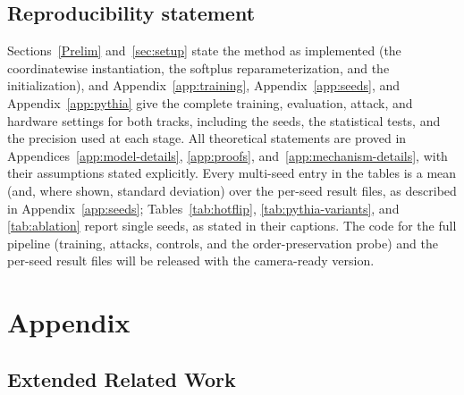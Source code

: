 \documentclass{article}
\theoremstyle{plain}
\theoremstyle{definition}
\theoremstyle{remark}
\theoremstyle{plain}
\begin{document}
\subsection*{Reproducibility statement}
Sections~\ref{Prelim} and~\ref{sec:setup} state the method as implemented (the coordinatewise instantiation, the softplus reparameterization, and the initialization), and Appendix~\ref{app:training}, Appendix~\ref{app:seeds}, and Appendix~\ref{app:pythia} give the complete training, evaluation, attack, and hardware settings for both tracks, including the seeds, the statistical tests, and the precision used at each stage. All theoretical statements are proved in Appendices~\ref{app:model-details}, \ref{app:proofs}, and~\ref{app:mechanism-details}, with their assumptions stated explicitly. Every multi-seed entry in the tables is a mean (and, where shown, standard deviation) over the per-seed result files, as described in Appendix~\ref{app:seeds}; Tables~\ref{tab:hotflip}, \ref{tab:pythia-variants}, and \ref{tab:ablation} report single seeds, as stated in their captions.
The code for the full pipeline (training, attacks, controls, and the order-preservation probe) and the per-seed result files will be released with the camera-ready version.





\newpage
\appendix
\section{Appendix}
\label{app:top}




\subsection{Extended Related Work}
\label{app:related}
\end{document}
